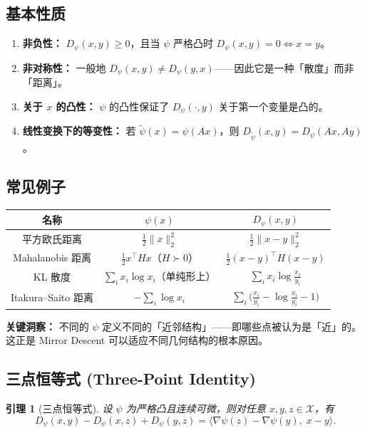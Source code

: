 \documentclass[12pt,a4paper]{ctexart}
\theoremstyle{definition}
\theoremstyle{plain}
\newtheorem{lemma}[theorem]{引理}
\theoremstyle{remark}
\newcommand{\cX}{\mathcal{X}}
\begin{document}
\subsection{基本性质}

\begin{enumerate}
  \item \textbf{非负性：} $D_\psi(x, y) \ge 0$，且当 $\psi$ 严格凸时 $D_\psi(x, y) = 0 \iff x = y$。
  \item \textbf{非对称性：} 一般地 $D_\psi(x, y) \neq D_\psi(y, x)$——因此它是一种「散度」而非「距离」。
  \item \textbf{关于 $x$ 的凸性：} $\psi$ 的凸性保证了 $D_\psi(\cdot, y)$ 关于第一个变量是凸的。
  \item \textbf{线性变换下的等变性：} 若 $\widetilde{\psi}(x) = \psi(Ax)$，则 $D_{\widetilde{\psi}}(x, y) = D_\psi(Ax, Ay)$。
\end{enumerate}

\subsection{常见例子}

\begin{center}
\renewcommand{\arraystretch}{1.6}
\begin{tabular}{c|c|c}
  \hline
  \textbf{名称} & $\psi(x)$ & $D_\psi(x, y)$ \\
  \hline
  平方欧氏距离 & $\frac{1}{2}\|x\|_2^2$ & $\frac{1}{2}\|x-y\|_2^2$ \\
  \hline
  Mahalanobis 距离 & $\frac{1}{2}x^\top H x$（$H \succ 0$） & $\frac{1}{2}(x-y)^\top H (x-y)$ \\
  \hline
  KL 散度 & $\sum_i x_i \log x_i$（单纯形上） & $\sum_i x_i \log\frac{x_i}{y_i}$ \\
  \hline
  Itakura–Saito 距离 & $-\sum_i \log x_i$ & $\sum_i\!\big(\frac{x_i}{y_i} - \log\frac{x_i}{y_i} - 1\big)$ \\
  \hline
\end{tabular}
\end{center}

\textbf{关键洞察：} 不同的 $\psi$ 定义不同的「近邻结构」——即哪些点被认为是「近」的。这正是 Mirror Descent 可以适应不同几何结构的根本原因。

\subsection{三点恒等式 (Three-Point Identity)}

\begin{lemma}[三点恒等式]\label{lem:three-point}
设 $\psi$ 为严格凸且连续可微，则对任意 $x, y, z \in \cX$，有
\begin{equation}\label{eq:three-point}
  D_\psi(x, y) - D_\psi(x, z) + D_\psi(y, z)
  = \langle \nabla\psi(z) - \nabla\psi(y),\; x - y \rangle.
\end{equation}
\end{lemma}
\end{document}

